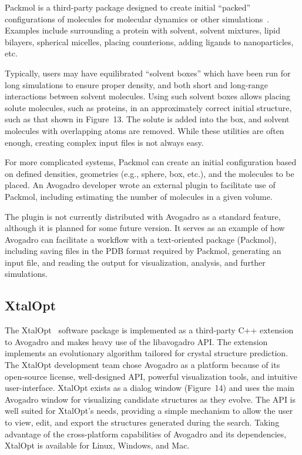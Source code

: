 \documentclass[10pt]{bmc_article}
\newenvironment{bmcformat}{\begin{raggedright}
  \baselineskip20pt\sloppy\setboolean{publ}{false}}{\end{raggedright}
  \baselineskip20pt\sloppy}
\begin{document}
\begin{bmcformat}
Packmol is a third-party package designed to create initial
``packed'' configurations of molecules for molecular dynamics or other
simulations~\cite{packmol,packmol-packing}. Examples include
surrounding a protein with solvent, solvent mixtures, lipid bilayers,
spherical micelles, placing counterions, adding ligands to
nanoparticles, etc.

Typically, users may have equilibrated ``solvent boxes'' which have
been run for long simulations to ensure proper density, and both short
and long-range interactions between solvent molecules. Using such
solvent boxes allows placing solute molecules, such as proteins, in an
approximately correct initial structure, such as that shown in Figure~13.
The solute is added into the
box, and solvent molecules with overlapping atoms are removed. While
these utilities are often enough, creating complex input files is not
always easy.

For more complicated systems, Packmol can create an initial
configuration based on defined densities, geometries (e.g., sphere,
box, etc.), and the molecules to be placed. An Avogadro developer wrote
an external plugin to facilitate use of Packmol, including estimating
the number of molecules in a given volume.

The plugin is not currently distributed with Avogadro as a standard
feature, although it is planned for some future version. It serves as
an example of how Avogadro can facilitate a workflow with a
text-oriented package (Packmol), including saving files in the PDB
format required by Packmol, generating an input file, and reading the
output for visualization, analysis, and further simulations.

\subsection*{XtalOpt}

The XtalOpt~\cite{xo1, xo2} software package is implemented as a third-party C++
extension to Avogadro and makes heavy use of the libavogadro API. The extension
implements an evolutionary algorithm tailored for crystal structure prediction.
The XtalOpt development team chose Avogadro as a platform because of its
open-source license, well-designed API, powerful visualization tools, and
intuitive user-interface. XtalOpt exists as a dialog window
(Figure~14) and uses the main Avogadro window for visualizing
candidate structures as they evolve. The API is well suited for XtalOpt’s needs,
providing a simple mechanism to allow the user to view, edit, and export the
structures generated during the search. Taking advantage of the cross-platform
capabilities of Avogadro and its dependencies, XtalOpt is available for Linux,
Windows, and Mac.


\end{bmcformat}
\end{document}
